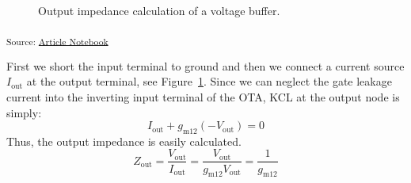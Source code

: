 \documentclass[
  a4paper,
  DIV=11,
  numbers=noendperiod]{scrartcl}
\begin{document}
\begin{figure}[H]


\caption{\label{fig-voltage-buffer-ota-noise-zout}Output impedance
calculation of a voltage buffer.}

\end{figure}%

\textsubscript{Source:
\href{https://iic-jku.github.io/analog-circuit-design/index.qmd.html}{Article
Notebook}}

\begin{tcolorbox}[enhanced jigsaw, titlerule=0mm, left=2mm, coltitle=black, toprule=.15mm, breakable, opacitybacktitle=0.6, colframe=quarto-callout-note-color-frame, bottomtitle=1mm, toptitle=1mm, opacityback=0, colbacktitle=quarto-callout-note-color!10!white, title=\textcolor{quarto-callout-note-color}{\faInfo}\hspace{0.5em}{Output Impedance of the Voltage Buffer}, arc=.35mm, rightrule=.15mm, colback=white, bottomrule=.15mm, leftrule=.75mm]

First we short the input terminal to ground and then we connect a
current source \(I_\mathrm{out}\) at the output terminal, see
Figure~\ref{fig-voltage-buffer-ota-noise-zout}. Since we can neglect the
gate leakage current into the inverting input terminal of the OTA, KCL
at the output node is simply: \[
I_\mathrm{out} + g_\mathrm{m12}\left(-V_\mathrm{out}\right) = 0
\] Thus, the output impedance is easily calculated. \[
Z_\mathrm{out} = \frac{V_\mathrm{out}}{I_\mathrm{out}} = \frac{V_\mathrm{out}}{g_\mathrm{m12}V_\mathrm{out}} = \frac{1}{g_\mathrm{m12}}
\]

\end{tcolorbox}
\end{document}
